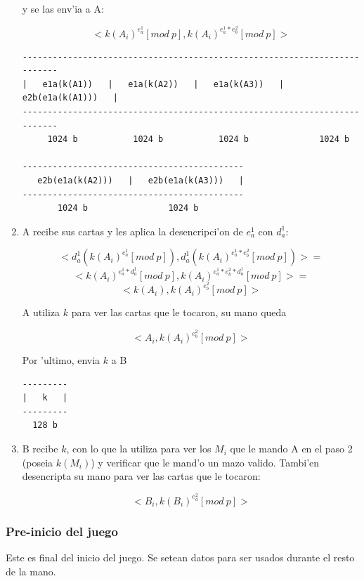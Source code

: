 \begin{enumerate}
y se las env'ia a A:

$$	<k(A_i)^{e^1_a} [mod\ p],			k(A_i)^{e^1_a * e^2_b} [mod\ p]> $$
	

\begin{verbatim}
--------------------------------------------------------------------------
|   e1a(k(A1))   |   e1a(k(A2))   |   e1a(k(A3))   |   e2b(e1a(k(A1)))   |
--------------------------------------------------------------------------
     1024 b           1024 b           1024 b              1024 b         

--------------------------------------------
   e2b(e1a(k(A2)))   |   e2b(e1a(k(A3)))   |
--------------------------------------------
       1024 b                1024 b         
\end{verbatim}
	
	
	
	
	
\item A recibe sus cartas y les aplica la desencripci'on de $e^1_a$ con $d^1_a$:

$$	<d^1_a(k(A_i)^{e^1_a} [mod\ p]),			d^1_a(k(A_i)^{e^1_a * e^2_b} [mod\ p])> = $$
$$	<k(A_i)^{e^1_a * d^1_a} [mod\ p],			k(A_i)^{e^1_a * e^2_b * d^1_a} [mod\ p]> = $$
$$	<k(A_i),								k(A_i)^{e^2_b} [mod\ p]> $$
	
A utiliza $k$ para ver las cartas que le tocaron, su mano queda

$$	<A_i, k(A_i)^{e^2_b} [mod\ p]> $$

Por 'ultimo, envia $k$ a B


\begin{verbatim}
---------
|   k   |
---------
  128 b
\end{verbatim}

	 
	 
	 


\item B recibe $k$, con lo que la utiliza para ver los $M_i$ que le mando A en el paso 2 (poseia $k(M_i)$) y verificar que le mand'o un mazo valido. Tambi'en desencripta su mano para ver las cartas que le tocaron:

$$	<B_i, k(B_i)^{e^2_a} [mod\ p]> $$
	
\end{enumerate}	




\subsubsection{Pre-inicio del juego}
Este es final del inicio del juego. Se setean datos para ser usados durante el resto de la mano.

